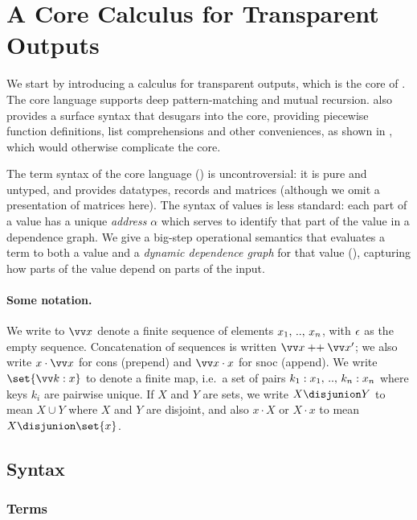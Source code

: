 \section{A Core Calculus for Transparent Outputs}
\label{sec:core}

We start by introducing a calculus for transparent outputs, which is the core of \OurLang. The core language
supports deep pattern-matching and mutual recursion. \OurLang also provides a surface syntax that desugars
into the core, providing piecewise function definitions, list comprehensions and other conveniences, as shown
in , which would otherwise complicate
the core.

The term syntax of the core language () is uncontroversial: it is pure and untyped, and
provides datatypes, records and matrices (although we omit a presentation of matrices here). The syntax of
values is less standard: each part of a value has a unique \emph{address} $\alpha$ which serves to identify
that part of the value in a dependence graph. We give a big-step operational semantics that evaluates a term
to both a value and a \emph{dynamic dependence graph} for that value (), capturing how
parts of the value depend on parts of the input.

\paragraph{Some notation.} We write to ${\seq{x}}$ denote a finite sequence of elements ${x_1} ,\, .. ,\, {x_n}$,
with $\epsilon$ as the empty sequence. Concatenation of sequences is written $\seq{x} \concat \seq{x}'$; we
also write $x \cons \seq{x}$ for cons (prepend) and $\seq{x} \cons x$ for snoc (append). We write
$\set{\seq{\bind{k}{x}}}$ to denote a finite map, i.e.~a set of pairs
${{k_1}:{x_1}} ,\, .. ,\, {{k_n}:{x_n}}$ where keys $k_i$ are pairwise unique. If $X$ and $Y$ are sets,
we write $X \disjunion Y$ to mean $X \cup Y$ where $X$ and $Y$ are disjoint, and also $x \cdot X$ or $X \cdot
x$ to mean $X \disjunion \set{x}$.

\subsection{Syntax}
\label{sec:core:syntax}



\subsubsection{Terms}
\label{sec:core:expressions}

